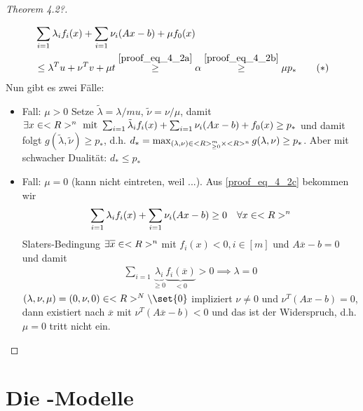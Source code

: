 \begin{proof}[Theorem 4.2?]
\begin{itemize}
		\begin{align*}
			&\sum_{i=1} \lambda_i f_i(x) + \sum_{i=1} \nu_i(Ax-b) + \mu f_0(x)\\
			&\le \lambda^T u + \nu^T v + \mu t \overset{\eqref{proof_eq_4_2a}}{\ge} \alpha \overset{\eqref{proof_eq_4_2b}}{\ge} \mu p_{\ast}\tag{$\ast$}\label{proof_eq_4_2c}
		\end{align*}
		Nun gibt es zwei Fälle:
		\begin{itemize}
			\item Fall: $\mu > 0$ Setze $\tilde{\lambda} = \lambda / mu$, $\tilde{\nu} = \nu /\mu$, damit\\
			$\exists x \in <R>^n \text{ mit } \sum_{i=1} \tilde{\lambda}_i f_i(x) + \sum_{i=1} \nu_i (Ax-b) + f_0(x) \ge p_{\ast}$ und damit folgt $g(\tilde{\lambda}, \tilde{\nu}) \ge p_{\ast}$, d.h. $d_{\ast} = \max_{(\lambda, \nu)\in <R>_{\ge 0}^m \times <R>^n} g(\lambda, \nu) \ge p_{\ast}$. Aber mit schwacher Dualität: $d_{\ast} \le p_{\ast}$
			\item Fall: $\mu = 0$ (kann nicht eintreten, weil ...). Aus \eqref{proof_eq_4_2c} bekommen wir
			\begin{align*}
				\sum_{i=1} \lambda_i f_i(x) + \sum_{i=1} \nu_i(Ax-b) \ge 0 \quad \forall x \in <R>^n
			\end{align*}
			Slaters-Bedingung $\exists \overline{x} \in \R^n$ mit $f_i(x) < 0, i \in [m]$ und $A\overline{x} - b = 0$ und damit
			\begin{align*}
				\sum_{i=1}\underbrace{\lambda_i}_{\ge 0}\underbrace{f_i(\overline{x})}_{< 0} > 0 \implies \lambda = 0
			\end{align*}
			$(\lambda, \nu, \mu) = (0, \nu, 0)\in \R^N \setminus \set{0}$ impliziert $\nu \neq 0$ und $\nu^T(Ax-b) = 0$, dann existiert nach $\overline{x}$ mit $\nu^T(A\overline{x} - b) < 0$ und das ist der Widerspruch, d.h. $\mu = 0$ tritt nicht ein.
		\end{itemize}
	\end{itemize}
\end{proof}
\section{Die -Modelle}
